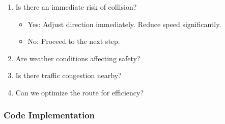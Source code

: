 \documentclass{article}
\begin{document}
\begin{enumerate}
    \item Is there an immediate risk of collision?
    \begin{itemize}
        \item Yes: Adjust direction immediately. Reduce speed significantly.
        \item No: Proceed to the next step.
    \end{itemize}
    \item Are weather conditions affecting safety?
    \item Is there traffic congestion nearby?
    \item Can we optimize the route for efficiency?
\end{enumerate}
\subsubsection{Code Implementation}
\end{document}
